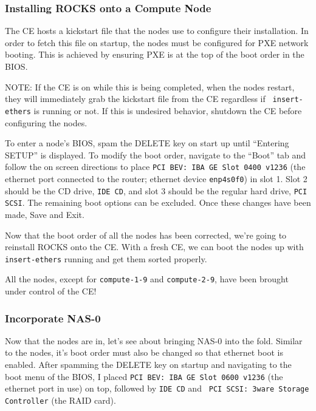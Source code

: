 \documentclass[12pt]{article}
\begin{document}
\subsubsection{Installing ROCKS onto a Compute Node}

\qq The CE hosts a kickstart file that the nodes use to configure their
installation. In order to fetch this file on startup, the nodes must be
configured for PXE network booting. This is achieved by ensuring PXE is at the
top of the boot order in the BIOS.

\qq NOTE: If the CE is on while this is being completed, when the nodes restart,
they will immediately grab the kickstart file from the CE regardless if {\tt
  insert-ethers} is running or not. If this is undesired behavior, shutdown the
CE before configuring the nodes.

\qq To enter a node's BIOS, spam the DELETE key on start up until ``Entering
SETUP'' is displayed. To modify the boot order, navigate to the ``Boot'' tab and
follow the on screen directions to place {\tt PCI BEV: IBA GE Slot 0400 v1236}
(the ethernet port connected to the router; ethernet device {\tt enp4s0f0}) in
slot 1. Slot 2 should be the CD drive, {\tt IDE CD}, and slot 3 should be the
regular hard drive, {\tt PCI SCSI}. The remaining boot options can be
excluded. Once these changes have been made, Save and Exit.


\qq Now that the boot order of all the nodes has been corrected, we're going to
reinstall ROCKS onto the CE. With a fresh CE, we can boot the nodes up with {\tt
  insert-ethers} running and get them sorted properly. 

\qq All the nodes, except for {\tt compute-1-9} and {\tt compute-2-9}, have been
brought under control of the CE!

\subsubsection{Incorporate NAS-0}

\qq Now that the nodes are in, let's see about bringing NAS-0 into the
fold. Similar to the nodes, it's boot order must also be changed so that
ethernet boot is enabled. After spamming the DELETE key on startup and
navigating to the boot menu of the BIOS, I placed {\tt PCI BEV: IBA GE Slot 0600
  v1236} (the ethernet port in use) on top, followed by {\tt IDE CD} and {\tt
  PCI SCSI: 3ware Storage Controller} (the RAID card).
\end{document}
